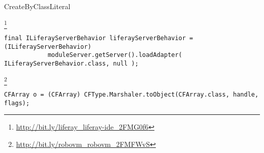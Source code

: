 \begin{pattern}{CreateByClassLiteral}

\instances{}

\footnote{\url{http://bit.ly/liferay_liferay-ide_2FMG0f6}}

\begin{verbatim}
final ILiferayServerBehavior liferayServerBehavior = (ILiferayServerBehavior)
            moduleServer.getServer().loadAdapter( ILiferayServerBehavior.class, null );
\end{verbatim}

\footnote{\url{http://bit.ly/robovm_robovm_2FMFWvS}}

\begin{verbatim}
CFArray o = (CFArray) CFType.Marshaler.toObject(CFArray.class, handle, flags);
\end{verbatim}

\detection{}

\discussion{}

\related{}

\end{pattern}